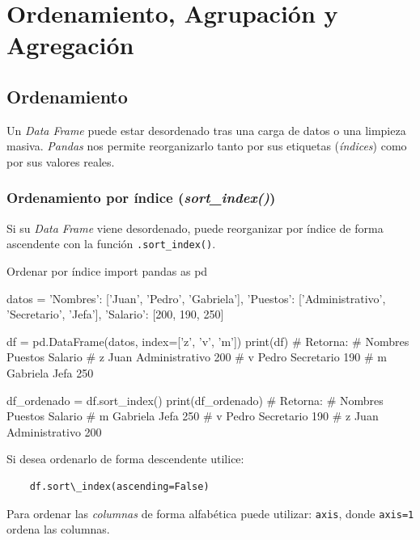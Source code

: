 \section{Ordenamiento, Agrupación y Agregación}

\subsection{Ordenamiento}

Un \textit{Data Frame} puede estar desordenado tras una carga de datos o una limpieza masiva. \textit{Pandas} nos permite reorganizarlo tanto por sus etiquetas (\textit{índices}) como por sus valores reales.

\subsubsection{Ordenamiento por índice (\textit{sort\_index()})}

Si su \textit{Data Frame} viene desordenado, puede reorganizar por índice de forma ascendente con la función \texttt{.sort\_index()}.
\begin{pycode}{Ordenar por índice}
import pandas as pd

datos = {
    'Nombres': ['Juan', 'Pedro', 'Gabriela'],
    'Puestos': ['Administrativo', 'Secretario', 'Jefa'],
    'Salario': [200, 190, 250]
}

df = pd.DataFrame(datos, index=['z', 'v', 'm']) 
print(df) # Retorna:
#     Nombres         Puestos  Salario
# z      Juan  Administrativo      200
# v     Pedro      Secretario      190
# m  Gabriela            Jefa      250

df_ordenado = df.sort_index()
print(df_ordenado) # Retorna: 
#     Nombres         Puestos  Salario
# m  Gabriela            Jefa      250
# v     Pedro      Secretario      190
# z      Juan  Administrativo      200
\end{pycode}

Si desea ordenarlo de forma descendente utilice: 
\begin{verbatim}
    df.sort\_index(ascending=False)
\end{verbatim}


Para ordenar las \textit{columnas} de forma alfabética puede utilizar: \texttt{axis}, donde \texttt{axis=1} ordena las columnas.

